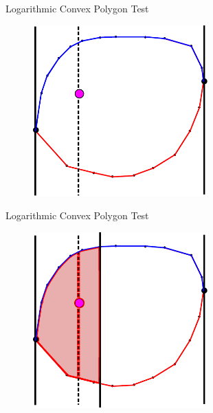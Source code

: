 \documentclass{beamer}
\begin{document}
\begin{frame}{Logarithmic Convex Polygon Test}

\begin{figure}[t]
	\centering
	\includegraphics[width=0.6\textwidth]{ConvexPolygonCastLines.pdf}
\end{figure}

\end{frame}


\begin{frame}{Logarithmic Convex Polygon Test}

\begin{figure}[t]
	\centering
	\includegraphics[width=0.6\textwidth]{ConvexPolygonCastLines1.pdf}
\end{figure}

\end{frame}
\end{document}
